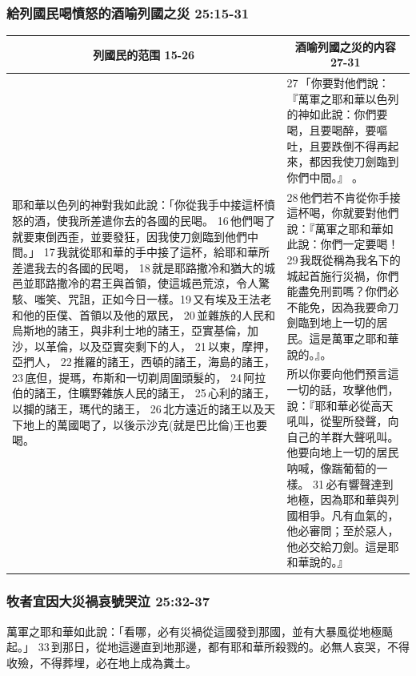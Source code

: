 \subsubsection{給列國民喝憤怒的酒喻列國之災 25:15-31}
\begin{table}[H]
\centering
\begin{tabular}{p{9.25cm}|p{}}\hline\hline
\multicolumn{1}{c|}{列國民的范围 15-26}&\multicolumn{1}{c}{酒喻列國之災的内容 27-31}\\\hline
\multirow{3}{9.35cm}{耶和華以色列的神對我如此說：「你從我手中接這杯憤怒的酒，使我所差遣你去的各國的民喝。 16 他們喝了就要東倒西歪，並要發狂，因我使刀劍臨到他們中間。」 17 我就從耶和華的手中接了這杯，給耶和華所差遣我去的各國的民喝， 18 就是耶路撒冷和猶大的城邑並耶路撒冷的君王與首領，使這城邑荒涼，令人驚駭、嗤笑、咒詛，正如今日一樣。19 又有埃及王法老和他的臣僕、首領以及他的眾民， 20 並雜族的人民和烏斯地的諸王，與非利士地的諸王，亞實基倫，加沙，以革倫，以及亞實突剩下的人， 21 以東，摩押，亞捫人， 22 推羅的諸王，西頓的諸王，海島的諸王， 23 底但，提瑪，布斯和一切剃周圍頭髮的， 24 阿拉伯的諸王，住曠野雜族人民的諸王， 25 心利的諸王，以攔的諸王，瑪代的諸王， 26 北方遠近的諸王以及天下地上的萬國喝了，以後示沙克(就是巴比倫)王也要喝。}
&27 「你要對他們說：『萬軍之耶和華以色列的神如此說：你們要喝，且要喝醉，要嘔吐，且要跌倒不得再起來，都因我使刀劍臨到你們中間。』 。\\\cline{2-2}
&28 他們若不肯從你手接這杯喝，你就要對他們說：『萬軍之耶和華如此說：你們一定要喝！ 29 我既從稱為我名下的城起首施行災禍，你們能盡免刑罰嗎？你們必不能免，因為我要命刀劍臨到地上一切的居民。這是萬軍之耶和華說的。』。\\\cline{2-2}
&所以你要向他們預言這一切的話，攻擊他們，說：『耶和華必從高天吼叫，從聖所發聲，向自己的羊群大聲吼叫。他要向地上一切的居民呐喊，像踹葡萄的一樣。 31 必有響聲達到地極，因為耶和華與列國相爭。凡有血氣的，他必審問；至於惡人，他必交給刀劍。這是耶和華說的。』\\\hline
\end{tabular}
\end{table}






\subsubsection{牧者宜因大災禍哀號哭泣 25:32-37}
萬軍之耶和華如此說：「看哪，必有災禍從這國發到那國，並有大暴風從地極颳起。」 33 到那日，從地這邊直到地那邊，都有耶和華所殺戮的。必無人哀哭，不得收殮，不得葬埋，必在地上成為糞土。 

